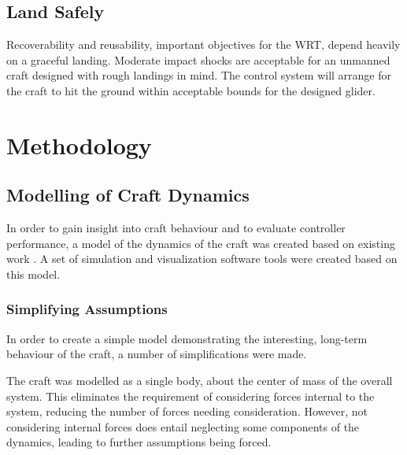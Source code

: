 \documentclass{sydeStyle}
\begin{document}
\section{Land Safely}

Recoverability and reusability, important objectives for the WRT, depend heavily
on a graceful landing. Moderate impact shocks are acceptable for an unmanned
craft designed with rough landings in mind. The control system will arrange for
the craft to hit the ground within acceptable bounds for the designed glider.

\chapter{Methodology}

\section{Modelling of Craft Dynamics}
\label{sec:modelling}

In order to gain insight into craft behaviour and to evaluate controller
performance, a model of the dynamics of the craft was created based on existing
work \cite{Rogallo1960}\cite{Layton1963}\cite{spottiswoode}. A set of simulation
and visualization software tools were created based on this model.

\subsection{Simplifying Assumptions}

In order to create a simple model demonstrating the interesting, long-term
behaviour of the craft, a number of simplifications were made.

The craft was modelled as a single body, about the center of mass of the overall
system. This eliminates the requirement of considering forces internal to the
system, reducing the number of forces needing consideration. However, not
considering internal forces does entail neglecting some components of the
dynamics, leading to further assumptions being forced.
\end{document}
